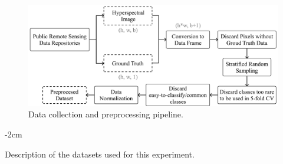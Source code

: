 \documentclass[information,article,submit,moreauthors,pdftex]{Definitions/mdpi}
\begin{document}
\begin{figure}
	\centering
    \captionsetup{justification=centering}
    \caption{Data collection and preprocessing pipeline.
    \vspace{.2cm}}
	\label{fig:data_preprocessing_pipeline}
	\includegraphics[width=.75\linewidth]{../analysis/data_preprocessing_pipeline}
\end{figure}
\begin{paracol}{2}
\linenumbers
\switchcolumn

\end{paracol}
\begin{table}
	\centering
    \addtolength{\leftskip} {-2cm}
    \addtolength{\rightskip}{-2cm}
    \captionsetup{justification=centering}
    \caption{Description of the datasets used for this
    experiment.\label{tab:datasets_description}}
\end{table}
\end{document}
